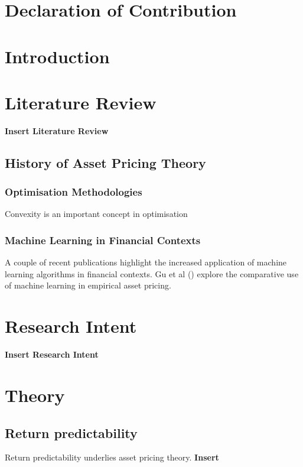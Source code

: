 \documentclass[10pt]{article}
\begin{document}
\section*{Declaration of Contribution}
\newpage
\tableofcontents
\newpage
\listoffigures
\listoftables
\newpage
\section{Introduction}
\newpage
\section{Literature Review}\label{LR}
\textbf{Insert Literature Review}
\subsection{History of Asset Pricing Theory}

\subsubsection{Optimisation Methodologies}
Convexity is an important concept in optimisation 
\subsubsection{Machine Learning in Financial Contexts}
A couple of recent publications highlight the increased application of machine learning algorithms in financial contexts.
\cite{corporate-culture}
Gu et al (\citeyear{eapvml}) explore the comparative use of machine learning in empirical asset pricing.

\section{Research Intent}
\textbf{Insert Research Intent}
\section{Theory}
\subsection{Return predictability}
Return predictability underlies asset pricing theory. 
\textbf{Insert}
\end{document}
